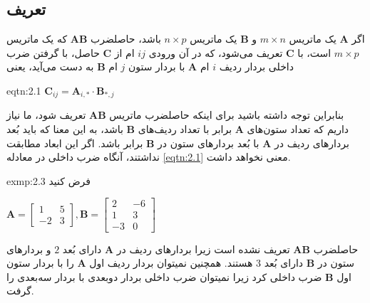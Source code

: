 \subsection{\textbf{تعریف}}
\label{subsec:2.2.1}
{
    \Large
    \begin{spacing}{1.5}
        اگر $\textbf{A}$ یک ماتریس $m\times n$ و $\textbf{B}$ یک ماتریس $n\times p$ باشد،
        حاصلضرب $\textbf{AB}$ که یک ماتریس $m\times p$ است، با $\textbf{C}$ تعریف می‌شود،
        که در آن ورودی $ij$ ام از $\textbf{C}$ حاصل، با گرفتن ضرب داخلی بردار ردیف $i$ ام $\textbf{A}$ با بردار ستون $j$ ام $\textbf{B}$ به دست می‌آید، یعنی

        \begin{eqtn}{eqtn:2.1}
            \centering
            $\textbf{C}_{ij}=\textbf{A}_{i,*}\cdot\textbf{B}_{*,j}$
        \end{eqtn}

        بنابراین توجه داشته باشید برای اینکه حاصلضرب ماتریس $\textbf{AB}$ تعریف شود، ما نیاز داریم که تعداد ستون‌های $\textbf{A}$ برابر با تعداد ردیف‌های $\textbf{B}$ باشد،
        به این معنا که باید بُعد بردارهای ردیف در $\textbf{A}$ با بُعد بردارهای ستون در $\textbf{B}$ برابر باشد.
        اگر این ابعاد مطابقت نداشتند، آنگاه ضرب داخلی در معادله \ref{eqtn:2.1} معنی نخواهد داشت.

        \begin{exmp}{exmp:2.3}
            \Large
            فرض کنید

            \begin{center}
                $\textbf{A}=\begin{bmatrix}
                                1  & 5 \\
                                -2 & 3
                \end{bmatrix}, \textbf{B}=\begin{bmatrix}
                                              2  & -6 \\
                                              1  & 3  \\
                                              -3 & 0
                \end{bmatrix}$
            \end{center}

            حاصلضرب $\textbf{AB}$ تعریف نشده است زیرا بردارهای ردیف در $\textbf{A}$ دارای بُعد $2$ و بردارهای ستون در $\textbf{B}$ دارای بُعد $3$ هستند.
            همچنین نمیتوان بردار ردیف اول $\textbf{A}$ را با بردار ستون اول $\textbf{B}$  ضرب داخلی کرد زیرا نمیتوان ضرب داخلی بردار دو‌بعدی با بردار سه‌بعدی را گرفت.
        \end{exmp}


\end{spacing}}
